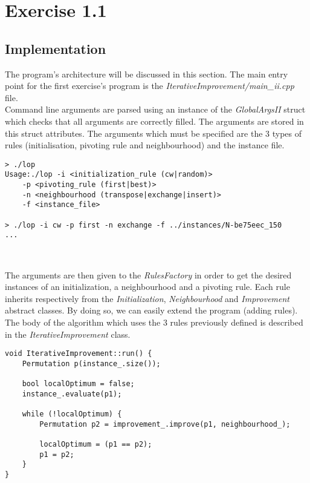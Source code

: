 \section{Exercise 1.1}

\subsection{Implementation}
The program's architecture will be discussed in this section. The main entry
point for the first exercise's program is the \emph{IterativeImprovement/main\_ii.cpp}
file.\\

Command line arguments are parsed using an instance of the \emph{GlobalArgsII}
struct which checks that all arguments are correctly filled. The arguments are
stored in this struct attributes. The arguments which must be specified are
the 3 types of rules (initialisation, pivoting rule and neighbourhood) and the
instance file.\\

\begin{lstlisting}
> ./lop
Usage:./lop -i <initialization_rule (cw|random)>
	-p <pivoting_rule (first|best)>
	-n <neighbourhood (transpose|exchange|insert)>
	-f <instance_file>

> ./lop -i cw -p first -n exchange -f ../instances/N-be75eec_150
...
\end{lstlisting}
\

The arguments are then given to the \emph{RulesFactory} in order to get the
desired instances of an initialization, a neighbourhood and a pivoting rule.
Each rule inherits respectively from the \emph{Initialization},
\emph{Neighbourhood} and \emph{Improvement} abstract classes. By doing so, we
can easily extend the program (adding rules).\\

The body of the algorithm which uses the 3 rules previously defined is described
in the \emph{IterativeImprovement} class.\\

\begin{lstlisting}
void IterativeImprovement::run() {
    Permutation p(instance_.size());

    bool localOptimum = false;
    instance_.evaluate(p1);
    
    while (!localOptimum) {
        Permutation p2 = improvement_.improve(p1, neighbourhood_);
        
        localOptimum = (p1 == p2);
        p1 = p2;
    }
}
\end{lstlisting}
\

